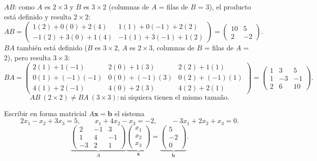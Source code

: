 \documentclass[11pt,letterpaper]{article}
\theoremstyle{definition}
\theoremstyle{plain}
\newcommand{\vv}[1]{\mathbf{#1}}
\begin{document}
\begin{description}
$AB$: como $A$ es $2\times 3$ y $B$ es $3\times 2$ (columnas de $A$ = filas de $B$ = 3), el
producto está definido y resulta $2\times 2$:
\[
  AB = \begin{pmatrix}
    1(2)+0(0)+2(4) & 1(1)+0(-1)+2(2) \\
    -1(2)+3(0)+1(4) & -1(1)+3(-1)+1(2)
  \end{pmatrix} = \begin{pmatrix}10&5\\2&-2\end{pmatrix}.
\]
$BA$ también está definido ($B$ es $3\times 2$, $A$ es $2\times 3$, columnas de $B$ = filas de $A$
= 2), pero resulta $3\times 3$:
\[
  BA = \begin{pmatrix}
    2(1)+1(-1) & 2(0)+1(3) & 2(2)+1(1) \\
    0(1)+(-1)(-1) & 0(0)+(-1)(3) & 0(2)+(-1)(1) \\
    4(1)+2(-1) & 4(0)+2(3) & 4(2)+2(1)
  \end{pmatrix} = \begin{pmatrix}1&3&5\\1&-3&-1\\2&6&10\end{pmatrix}.
\]
\[\boxed{AB\ (2\times 2) \neq BA\ (3\times 3): \text{ni siquiera tienen el mismo tamaño.}}\]

\item[\textbf{Ejercicio 4.}]
Escribir en forma matricial $A\vv{x}=\vv{b}$ el sistema
\[
  2x_1-x_2+3x_3=5,\qquad x_1+4x_2-x_3=-2,\qquad -3x_1+2x_2+x_3=0.
\]
\[
  \boxed{
  \underbrace{\begin{pmatrix}2&-1&3\\1&4&-1\\-3&2&1\end{pmatrix}}_{A}
  \underbrace{\begin{pmatrix}x_1\\x_2\\x_3\end{pmatrix}}_{\vv{x}} =
  \underbrace{\begin{pmatrix}5\\-2\\0\end{pmatrix}}_{\vv{b}}.}
\]


\end{description}
\end{document}

